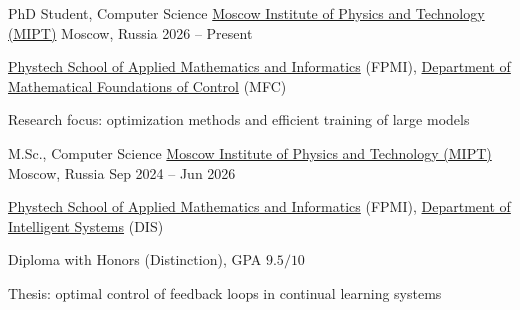 
\begin{cventries}

  \cventry
    {PhD Student, Computer Science} %
    {\href{https://en.wikipedia.org/wiki/Moscow_Institute_of_Physics_and_Technology}{Moscow Institute of Physics and Technology (MIPT)}} %
    {Moscow, Russia} %
    {2026 -- Present} %
    {
      \begin{cvitems}
        \item {\href{https://pk.mipt.ru/schools/fpmi/}{Phystech School of Applied Mathematics and Informatics} (FPMI), \href{https://new.mipt.ru/education/basic-departments/kafedra-matematicheskikh-osnov-upravleniya}{Department of Mathematical Foundations of Control} (MFC)}
        \item {Research focus: optimization methods and efficient training of large models}
      \end{cvitems}
    }

  \cventry
    {M.Sc., Computer Science} %
    {\href{https://en.wikipedia.org/wiki/Moscow_Institute_of_Physics_and_Technology}{Moscow Institute of Physics and Technology (MIPT)}} %
    {Moscow, Russia} %
    {Sep 2024 -- Jun 2026} %
    {
      \begin{cvitems}
        \item {\href{https://pk.mipt.ru/schools/fpmi/}{Phystech School of Applied Mathematics and Informatics} (FPMI), \href{https://intsystems.github.io}{Department of Intelligent Systems} (DIS)}
        \item {Diploma with Honors (Distinction), GPA $9.5/10$}
        \item {Thesis: optimal control of feedback loops in continual learning systems}
      \end{cvitems}
    }


\end{cventries}
